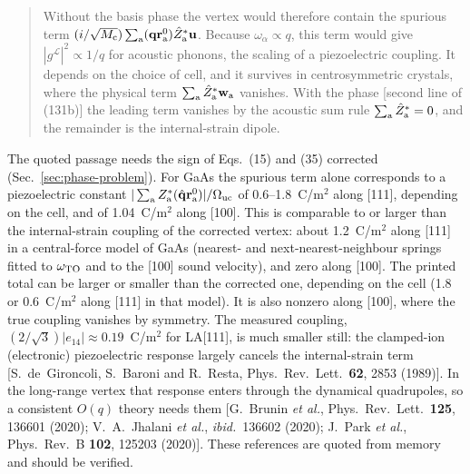 \documentclass[11pt]{article}
\begin{document}
\begin{quote}
\begin{equation*}
\tag{131b}
\end{equation*}
Without the basis phase the vertex would therefore contain the spurious term
$(i/\sqrt{M_{\rm c}})\sum_{\rm a}(\mathbf q\mathbf r^0_{\rm a})\hat Z^*_{\rm a}\mathbf u$. Because
$\omega_\alpha\propto q$, this term would give $|g^{\mathcal L}|^2\propto1/q$ for acoustic phonons, the
scaling of a piezoelectric coupling. It depends on the choice of cell, and it survives in
centrosymmetric crystals, where the physical term $\sum_{\rm a}\hat Z^*_{\rm a}\mathbf w_{\rm a}$ vanishes.
With the phase [second line of (131b)] the leading term vanishes by the acoustic sum rule
$\sum_{\rm a}\hat Z^*_{\rm a}=0$, and the remainder is the internal-strain dipole.
\end{quote}
The quoted passage needs the sign of Eqs.~(15) and (35) corrected (Sec.~\ref{sec:phase-problem}).
For GaAs the spurious term alone
corresponds to a piezoelectric constant $|\sum_{\rm a}Z^*_{\rm a}(\hat{\mathbf q}\mathbf r^0_{\rm a})|/\Omega_{\rm uc}$
of 0.6--1.8~C/m$^2$ along [111], depending on the cell, and of 1.04~C/m$^2$ along [100]. This is
comparable to or larger than the internal-strain coupling of the corrected vertex: about 1.2~C/m$^2$
along [111] in a central-force model of GaAs (nearest- and next-nearest-neighbour springs fitted to
$\omega_{\rm TO}$ and to the [100] sound velocity), and zero along [100]. The printed total can be larger
or smaller than the corrected one, depending on the cell (1.8 or 0.6~C/m$^2$ along [111] in that model).
It is also nonzero along [100], where the true coupling vanishes by symmetry. The measured coupling,
$(2/\sqrt3)|e_{14}|\approx0.19$~C/m$^2$ for LA[111], is much smaller still: the clamped-ion (electronic) piezoelectric response largely cancels
the internal-strain term [S.~de~Gironcoli, S.~Baroni and R.~Resta, Phys.\ Rev.\ Lett.\ \textbf{62}, 2853
(1989)]. In the long-range vertex that response enters through the dynamical quadrupoles, so a
consistent $O(q)$ theory needs them [G.~Brunin \textit{et al.}, Phys.\ Rev.\ Lett.\ \textbf{125}, 136601
(2020); V.~A.~Jhalani \textit{et al.}, \textit{ibid.}\ 136602 (2020); J.~Park \textit{et al.}, Phys.\ Rev.\ B
\textbf{102}, 125203 (2020)]. These references are quoted from memory and should be verified.
\end{document}
